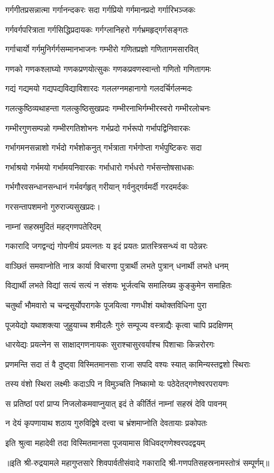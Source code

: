 \twolineshloka
{गर्गगीतप्रसन्नात्मा गर्गानन्दकरः सदा}%
{गर्गप्रियो गर्गमानप्रदो गर्गारिभञ्जकः}%

\twolineshloka
{गर्गवर्गपरित्राता गर्गसिद्धिप्रदायकः}%
{गर्गग्लानिहरो गर्गभ्रमहृद्गर्गसङ्गतः}%

\twolineshloka
{गर्गाचार्यो गर्गमुनिर्गर्गसम्मानभाजनः}%
{गम्भीरो गणितप्रज्ञो गणितागमसारवित्}%

\twolineshloka
{गणको गणकश्लाघ्यो गणकप्रणयोत्सुकः}%
{गणकप्रवणस्वान्तो गणितो गणितागमः}%

\twolineshloka
{गद्यं गद्यमयो गद्यपद्यविद्याविशारदः}%
{गललग्नमहानागो गलदर्चिर्गलन्मदः}%

\twolineshloka
{गलत्कुष्ठिव्यथाहन्ता गलत्कुष्ठिसुखप्रदः}%
{गम्भीरनाभिर्गम्भीरस्वरो गम्भीरलोचनः}%

\twolineshloka
{गम्भीरगुणसम्पन्नो गम्भीरगतिशोभनः}%
{गर्भप्रदो गर्भरूपो गर्भापद्विनिवारकः}%

\twolineshloka
{गर्भागमनसन्नाशो गर्भदो गर्भशोकनुत्}%
{गर्भत्राता गर्भगोप्ता गर्भपुष्टिकरः सदा}%

\twolineshloka
{गर्भाश्रयो गर्भमयो गर्भामयनिवारकः}%
{गर्भाधारो गर्भधरो गर्भसन्तोषसाधकः}%

\twolineshloka
{गर्भगौरवसन्धानसन्धानं गर्भवर्गहृत्}%
{गरीयान् गर्वनुद्गर्वमर्दी गरदमर्दकः}%

{गरसन्तापशमनो गुरुराज्यसुखप्रदः।}%

\onelineshloka
{नाम्नां सहस्रमुदितं महद्गणपतेरिदम्}%


\twolineshloka
{गकारादि जगद्वन्द्यं गोपनीयं प्रयत्नतः}%
{य इदं प्रयतः प्रातस्त्रिसन्ध्यं वा पठेन्नरः}%

\twolineshloka
{वाञ्छितं समवाप्नोति नात्र कार्या विचारणा}%
{पुत्रार्थी लभते पुत्रान् धनार्थी लभते धनम्}%

\twolineshloka
{विद्यार्थी लभते विद्यां सत्यं सत्यं न संशयः}%
{भूर्जत्वचि समालिख्य कुङ्कुमेन समाहितः}%

\twolineshloka
{चतुर्थां भौमवारो च चन्द्रसूर्योपरागके}%
{पूजयित्वा गणधीशं यथोक्तविधिना पुरा}%

\twolineshloka
{पूजयेद्यो यथाशक्त्या जुहुयाच्च शमीदलैः}%
{गुरुं सम्पूज्य वस्त्राद्यैः कृत्वा चापि प्रदक्षिणम्}%

\twolineshloka
{धारयेद्यः प्रयत्नेन स साक्षाद्गणनायकः}%
{सुराश्चासुरवर्याश्च पिशाचाः किन्नरोरगः}%

\twolineshloka
{प्रणमन्ति सदा तं वै दुष्ट्वा विस्मितमानसाः}%
{राजा सपदि वश्यः स्यात् कामिन्यस्तद्वशो स्थिराः}%

\twolineshloka
{तस्य वंशो स्थिरा लक्ष्मीः कदाऽपि न विमुञ्चति}%
{निष्कामो यः पठेदेतद्गणेश्वरपरायणः}%

\twolineshloka
{स प्रतिष्ठां परां प्राप्य निजलोकमवाप्नुयात्}%
{इदं ते कीर्तितं नाम्नां सहस्रं देवि पावनम्}%

\twolineshloka
{न देयं कृपणायाथ शठाय गुरुविद्विषे}%
{दत्त्वा च भ्रंशमाप्नोति देवतायाः प्रकोपतः}%

\twolineshloka
{इति श्रुत्वा महादेवी तदा विस्मितमानसा}%
{पूजयामास विधिवद्गणेश्वरपदद्वयम्}%

॥इति श्री-रुद्रयामले महागुप्तसारे शिवपार्वतीसंवादे गकारादि श्री-गणपतिसहस्रनामस्तोत्रं सम्पूर्णम्॥
